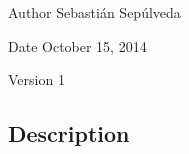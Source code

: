 \begin{DoxyAuthor}{Author}
Sebastián Sepúlveda 
\end{DoxyAuthor}
\begin{DoxyDate}{Date}
October 15, 2014 
\end{DoxyDate}
\begin{DoxyVersion}{Version}
1
\end{DoxyVersion}
\subsection*{Description}